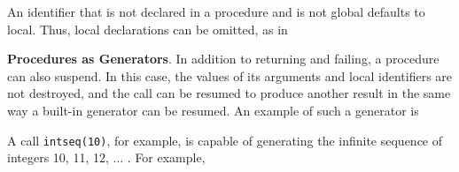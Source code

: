 An identifier that is not declared in a procedure and is not global
defaults to local. Thus, local declarations can be omitted, as in




\textbf{Procedures as Generators}. In addition to returning and
failing, a procedure can also suspend. In this case, the values of its
arguments and local identifiers are not destroyed, and the call can
be resumed to produce another result in the same way a built-in
generator can be resumed. An example of such a generator is



A call \texttt{intseq(10)}, for example, is capable of generating the
infinite sequence of integers 10, 11, 12, ... .  For example,



